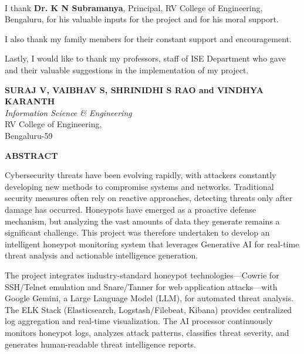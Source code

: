 \documentclass[12pt,a4paper]{report}
\begin{document}
I thank \textbf{Dr. K N Subramanya}, Principal, RV College of Engineering\textsuperscript{\textregistered}, Bengaluru, for his valuable inputs for the project and for his moral support.

\vspace{0.5cm}

I also thank my family members for their constant support and encouragement.

\vspace{0.5cm}

Lastly, I would like to thank my professors, staff of ISE Department who gave and their valuable suggestions in the implementation of my project.

\vspace{1.5cm}

\begin{flushright}
\textbf{SURAJ V, VAIBHAV S, SHRINIDHI S RAO and VINDHYA KARANTH}\\
\textit{Information Science \& Engineering}\\
RV College of Engineering,\\
Bengaluru-59
\end{flushright}

\newpage

\begin{center}
{\Large \textbf{ABSTRACT}}
\end{center}

\vspace{0.5cm}

Cybersecurity threats have been evolving rapidly, with attackers constantly developing new methods to compromise systems and networks. Traditional security measures often rely on reactive approaches, detecting threats only after damage has occurred. Honeypots have emerged as a proactive defense mechanism, but analyzing the vast amounts of data they generate remains a significant challenge. This project was therefore undertaken to develop an intelligent honeypot monitoring system that leverages Generative AI for real-time threat analysis and actionable intelligence generation.

The project integrates industry-standard honeypot technologies—Cowrie for SSH/Telnet emulation and Snare/Tanner for web application attacks—with Google Gemini, a Large Language Model (LLM), for automated threat analysis. The ELK Stack (Elasticsearch, Logstash/Filebeat, Kibana) provides centralized log aggregation and real-time visualization. The AI processor continuously monitors honeypot logs, analyzes attack patterns, classifies threat severity, and generates human-readable threat intelligence reports.
\end{document}
